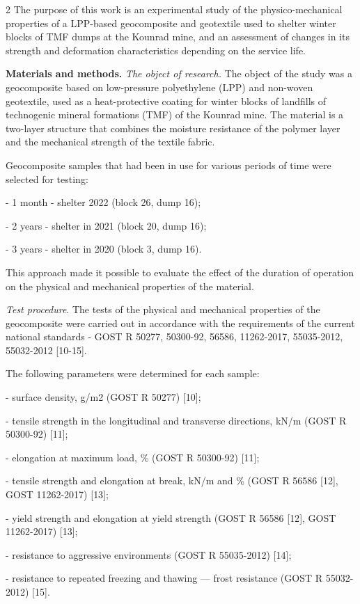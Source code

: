 \begin{multicols}{2}
The purpose of this work is an experimental study of the
physico-mechanical properties of a LPP-based geocomposite and geotextile
used to shelter winter blocks of TMF dumps at the Kounrad mine, and an
assessment of changes in its strength and deformation characteristics
depending on the service life.

{\bfseries Materials and methods.} \emph{The object of research.} The
object of the study was a geocomposite based on low-pressure
polyethylene (LPP) and non-woven geotextile, used as a heat-protective
coating for winter blocks of landfills of technogenic mineral formations
(TMF) of the Kounrad mine. The material is a two-layer structure that
combines the moisture resistance of the polymer layer and the mechanical
strength of the textile fabric.

Geocomposite samples that had been in use for various periods of time
were selected for testing:

- 1 month - shelter 2022 (block 26, dump 16);

- 2 years - shelter in 2021 (block 20, dump 16);

- 3 years - shelter in 2020 (block 3, dump 16).

This approach made it possible to evaluate the effect of the duration of
operation on the physical and mechanical properties of the material.

\emph{Test procedure}. The tests of the physical and mechanical
properties of the geocomposite were carried out in accordance with the
requirements of the current national standards - GOST R 50277, 50300-92,
56586, 11262-2017, 55035-2012, 55032-2012 {[}10-15{]}.

The following parameters were determined for each sample:

- surface density, g/m2 (GOST R 50277) {[}10{]};

- tensile strength in the longitudinal and transverse directions, kN/m
(GOST R 50300-92) {[}11{]};

- elongation at maximum load, \% (GOST R 50300-92) {[}11{]};

- tensile strength and elongation at break, kN/m and \% (GOST R 56586
{[}12{]}, GOST 11262-2017) {[}13{]};

- yield strength and elongation at yield strength (GOST R 56586
{[}12{]}, GOST 11262-2017) {[}13{]};

- resistance to aggressive environments (GOST R 55035-2012) {[}14{]};

- resistance to repeated freezing and thawing --- frost resistance (GOST
R 55032-2012) {[}15{]}.


\end{multicols}
